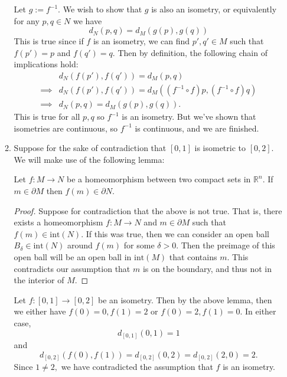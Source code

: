\documentclass{article}
\numberwithin{equation}{section}
\begin{document}
\begin{enumerate}
\begin{enumerate}[label=(\alph*)]
        Let $g := f^{-1}.$ We wish to show that $g$ is also an isometry, or equivalently for any $p,q\in N$ we have 
        \begin{equation}
            d_N(p, q) = d_M(g(p), g(q))
        \end{equation}
        This is true since if $f$ is an isometry, we can find $p',q'\in M$ such that $f(p')=p$ and $f(q')=q.$ Then by definition, the following chain of implications hold:
        \begin{align}
            & d_N(f(p'), f(q')) = d_M(p, q) \\ 
             \implies & d_N(f(p'), f(q')) = d_M((f^{-1}\circ f)p,(f^{-1}\circ f)q) \\ 
             \implies & d_N(p, q) = d_M(g(p), g(q)).
        \end{align}
        This is true for all $p,q$ so $f^{-1}$ is an isometry. But we've shown that isometries are continuous, so $f^{-1}$ is continuous, and we are finished. 
        \item Suppose for the sake of contradiction that $[0,1]$ is isometric to $[0,2].$ We will make use of the following lemma:
        \begin{lemma}
            Let $f: M\to N$ be a homeomorphism between two compact sets in $\mathbb{R}^n.$ If $m \in \partial M$ then $f(m) \in \partial N.$
            \begin{proof}
                Suppose for contradiction that the above is not true. That is, there exists a homeomorphism $f:M\to N$ and $m\in \partial M$ such that $f(m) \in \text{int}(N).$ If this was true, then we can consider an open ball $B_\delta \in \text{int}(N)$ around $f(m)$ for some $\delta > 0.$ Then the preimage of this open ball will be an open ball in $\text{int}(M)$ that contains $m.$ This contradicts our assumption that $m$ is on the boundary, and thus not in the interior of $M.$
            \end{proof}
        \end{lemma}
        Let $f: [0,1] \to [0,2]$ be an isometry. Then by the above lemma, then we either have $f(0)=0, f(1)=2$ or $f(0)=2,f(1)=0.$ In either case,
        \begin{equation}
            d_{[0,1]}(0, 1) = 1
        \end{equation}
        and 
        \begin{equation}
            d_{[0,2]}(f(0), f(1)) = d_{[0,2]}(0, 2) = d_{[0,2]}(2, 0) = 2.
        \end{equation}
        Since $1 \neq 2,$ we have contradicted the assumption that $f$ is an isometry.

\end{enumerate}
\end{enumerate}
\end{document}
